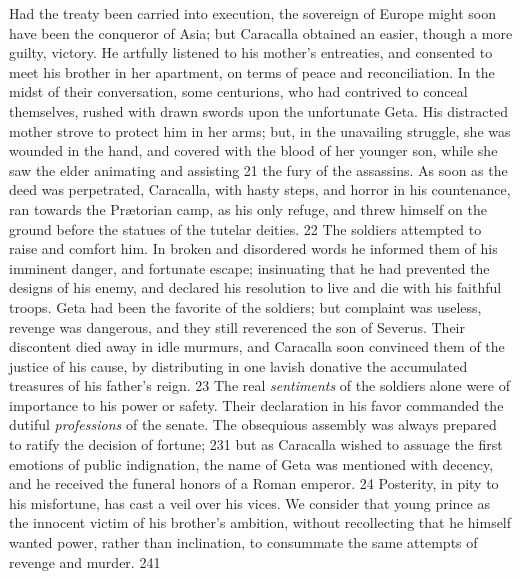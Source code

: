 Had the treaty been carried into execution, the sovereign of
Europe might soon have been the conqueror of Asia; but Caracalla
obtained an easier, though a more guilty, victory. He artfully
listened to his mother’s entreaties, and consented to meet his
brother in her apartment, on terms of peace and reconciliation.
In the midst of their conversation, some centurions, who had
contrived to conceal themselves, rushed with drawn swords upon
the unfortunate Geta. His distracted mother strove to protect him
in her arms; but, in the unavailing struggle, she was wounded in
the hand, and covered with the blood of her younger son, while
she saw the elder animating and assisting 21 the fury of the
assassins. As soon as the deed was perpetrated, Caracalla, with
hasty steps, and horror in his countenance, ran towards the
Prætorian camp, as his only refuge, and threw himself on the
ground before the statues of the tutelar deities. 22 The soldiers
attempted to raise and comfort him. In broken and disordered
words he informed them of his imminent danger, and fortunate
escape; insinuating that he had prevented the designs of his
enemy, and declared his resolution to live and die with his
faithful troops. Geta had been the favorite of the soldiers; but
complaint was useless, revenge was dangerous, and they still
reverenced the son of Severus. Their discontent died away in idle
murmurs, and Caracalla soon convinced them of the justice of his
cause, by distributing in one lavish donative the accumulated
treasures of his father’s reign. 23 The real \textit{sentiments} of the
soldiers alone were of importance to his power or safety. Their
declaration in his favor commanded the dutiful \textit{professions} of
the senate. The obsequious assembly was always prepared to ratify
the decision of fortune; 231 but as Caracalla wished to assuage
the first emotions of public indignation, the name of Geta was
mentioned with decency, and he received the funeral honors of a
Roman emperor. 24 Posterity, in pity to his misfortune, has cast
a veil over his vices. We consider that young prince as the
innocent victim of his brother’s ambition, without recollecting
that he himself wanted power, rather than inclination, to
consummate the same attempts of revenge and murder. 241



